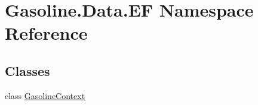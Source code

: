 \hypertarget{namespace_gasoline_1_1_data_1_1_e_f}{}\section{Gasoline.\+Data.\+EF Namespace Reference}
\label{namespace_gasoline_1_1_data_1_1_e_f}
\subsection*{Classes}
\begin{DoxyCompactItemize}
\item 
class \mbox{\hyperlink{class_gasoline_1_1_data_1_1_e_f_1_1_gasoline_context}{Gasoline\+Context}}
\end{DoxyCompactItemize}
